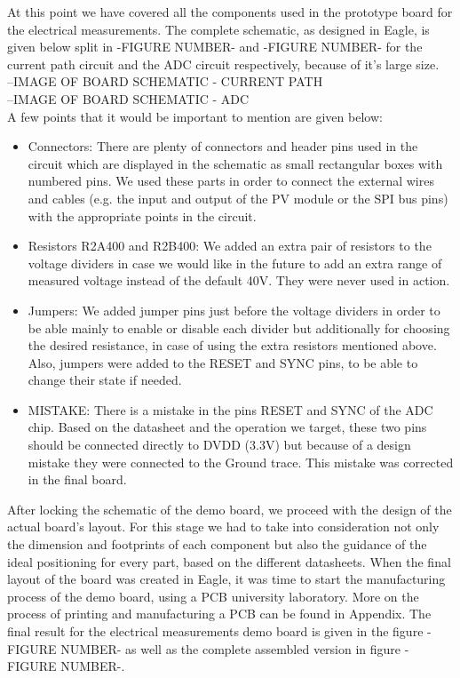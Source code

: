 At this point we have covered all the components used in the prototype board for the electrical measurements. The complete schematic, as designed in Eagle, is given below split in -FIGURE NUMBER- and -FIGURE NUMBER- for the current path circuit and the ADC circuit respectively, because of it's large size.\\

--IMAGE OF BOARD SCHEMATIC - CURRENT PATH\\

--IMAGE OF BOARD SCHEMATIC - ADC\\

A few points that it would be important to mention are given below:

\begin{itemize}
    \item Connectors: There are plenty of connectors and header pins used in the circuit which are displayed in the schematic as small rectangular boxes with numbered pins. We used these parts in order to connect the external wires and cables (e.g. the input and output of the PV module or the SPI bus pins) with the appropriate points in the circuit.
    \item Resistors R2A400 and R2B400: We added an extra pair of resistors to the voltage dividers in case we would like in the future to add an extra range of measured voltage instead of the default 40V. They were never used in action.
    \item Jumpers: We added jumper pins just before the voltage dividers in order to be able mainly to enable or disable each divider but additionally for choosing the desired resistance, in case of using the extra resistors mentioned above. Also, jumpers were added to the RESET and SYNC pins, to be able to change their state if needed.
    \item MISTAKE: There is a mistake in the pins RESET and SYNC of the ADC chip. Based on the datasheet and the operation we target, these two pins should be connected directly to DVDD (3.3V) but because of a design mistake they were connected to the Ground trace. This mistake was corrected in the final board.
    
\end{itemize}

After locking the schematic of the demo board, we proceed with the design of the actual board's layout. For this stage we had to take into consideration not only the dimension and footprints of each component but also the guidance of the ideal positioning for every part, based on the different datasheets. When the final layout of the board was created in Eagle, it was time to start the manufacturing process of the demo board, using a PCB university laboratory. More on the process of printing and manufacturing a PCB can be found in Appendix. The final result for the electrical measurements demo board is given in the figure -FIGURE NUMBER- as well as the complete assembled version in figure -FIGURE NUMBER-.\\

